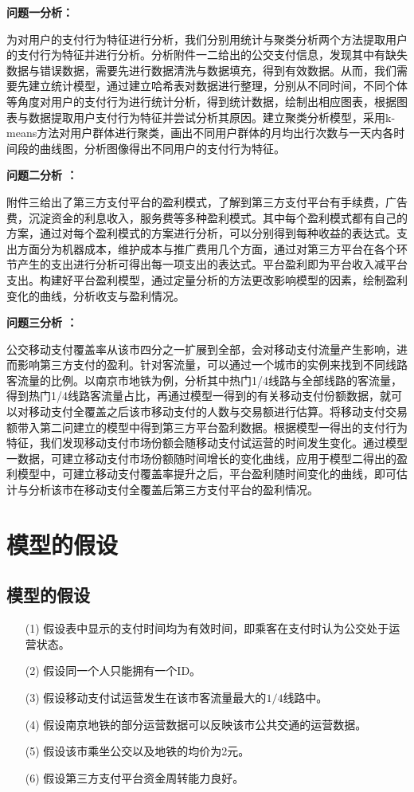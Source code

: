 \documentclass[withoutpreface,bwprint]{cumcmthesis} %
\begin{document}
\textbf{问题一分析：}

为对用户的支付行为特征进行分析，我们分别用统计与聚类分析两个方法提取用户的支付行为特征并进行分析。分析附件一二给出的公交支付信息，发现其中有缺失数据与错误数据，需要先进行数据清洗与数据填充，得到有效数据。从而，我们需要先建立统计模型，通过建立哈希表对数据进行整理，分别从不同时间，不同个体等角度对用户的支付行为进行统计分析，得到统计数据，绘制出相应图表，根据图表与数据提取用户支付行为特征并尝试分析其原因。建立聚类分析模型，采用k-means方法对用户群体进行聚类，画出不同用户群体的月均出行次数与一天内各时间段的曲线图，分析图像得出不同用户的支付行为特征。

\textbf{问题二分析 ：}

附件三给出了第三方支付平台的盈利模式，了解到第三方支付平台有手续费，广告费，沉淀资金的利息收入，服务费等多种盈利模式。其中每个盈利模式都有自己的方案，通过对每个盈利模式的方案进行分析，可以分别得到每种收益的表达式。支出方面分为机器成本，维护成本与推广费用几个方面，通过对第三方平台在各个环节产生的支出进行分析可得出每一项支出的表达式。平台盈利即为平台收入减平台支出。构建好平台盈利模型，通过定量分析的方法更改影响模型的因素，绘制盈利变化的曲线，分析收支与盈利情况。

\textbf{问题三分析 ：}

公交移动支付覆盖率从该市四分之一扩展到全部，会对移动支付流量产生影响，进而影响第三方支付的盈利。针对客流量，可以通过一个城市的实例来找到不同线路客流量的比例。以南京市地铁为例，分析其中热门1/4线路与全部线路的客流量，得到热门1/4线路客流量占比，再通过模型一得到的有关移动支付份额数据，就可以对移动支付全覆盖之后该市移动支付的人数与交易额进行估算。将移动支付交易额带入第二问建立的模型中得到第三方平台盈利数据。根据模型一得出的支付行为特征，我们发现移动支付市场份额会随移动支付试运营的时间发生变化。通过模型一数据，可建立移动支付市场份额随时间增长的变化曲线，应用于模型二得出的盈利模型中，可建立移动支付覆盖率提升之后，平台盈利随时间变化的曲线，即可估计与分析该市在移动支付全覆盖后第三方支付平台的盈利情况。

\section{模型的假设}


\subsection{模型的假设}

\begin{itemize}
\item[(1)] 假设表中显示的支付时间均为有效时间，即乘客在支付时认为公交处于运营状态。
\item[(2)] 假设同一个人只能拥有一个ID。
\item[(3)] 假设移动支付试运营发生在该市客流量最大的$1/4$线路中。
\item[(4)] 假设南京地铁的部分运营数据可以反映该市公共交通的运营数据。
\item[(5)] 假设该市乘坐公交以及地铁的均价为2元。 
\item[(6)] 假设第三方支付平台资金周转能力良好。
\end{itemize}
\end{document}
